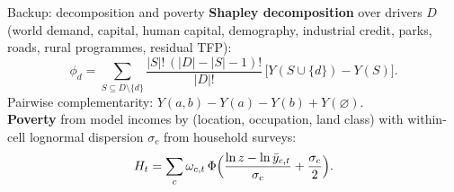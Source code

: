 \documentclass[10pt,aspectratio=169]{beamer}
\begin{document}
\begin{frame}{Backup: decomposition and poverty}
  \small
  \textbf{Shapley decomposition} over drivers $D$ (world demand, capital, human capital,
  demography, industrial credit, parks, roads, rural programmes, residual TFP):
  \begin{equation*}
    \phi_d=\sum_{S\subseteq D\setminus\{d\}}\frac{|S|!\,(|D|-|S|-1)!}{|D|!}\,
    \bigl[Y(S\cup\{d\})-Y(S)\bigr].
  \end{equation*}
  Pairwise complementarity: $Y(a,b)-Y(a)-Y(b)+Y(\varnothing)$.\\[0.5em]
  \textbf{Poverty} from model incomes by (location, occupation, land class) with
  within-cell lognormal dispersion $\sigma_c$ from household surveys:
  \begin{equation*}
    H_t=\sum_c\omega_{c,t}\,\Phi\Bigl(\frac{\ln z-\ln\bar y_{c,t}}{\sigma_c}+\frac{\sigma_c}{2}\Bigr).
  \end{equation*}
\end{frame}
\end{document}
